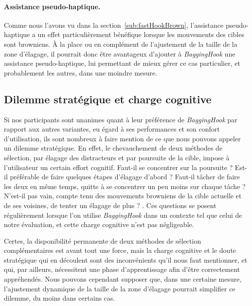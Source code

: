 	\paragraph{Assistance pseudo-haptique.}
	Comme nous l'avons vu dans la section~\ref{sub:fastHookBrown}, l'assistance pseudo-haptique a un effet particulièrement bénéfique lorsque les mouvements des cibles sont browniens. À la place ou en complément de l'ajustement de la taille de la zone d'élagage, il pourrait donc être avantageux d'ajouter à \emph{BaggingHook} une assistance pseudo-haptique, lui permettant de mieux gérer ce cas particulier, et probablement les autres, dans une moindre mesure.
	
	\subsection{Dilemme stratégique et charge cognitive}
	Si nos participants sont unanimes quant à leur préférence de \emph{BaggingHook} par rapport aux autres variantes, eu égard à ses performances et son confort d'utilisation, ils sont nombreux à faire mention de ce que nous pouvons appeler un dilemme stratégique. En effet, le chevauchement de deux méthodes de sélection, par élagage des distracteurs et par poursuite de la cible, impose à l'utilisateur un certain effort cognitif. \og Faut-il se concentrer sur la poursuite ? Est-il préférable de faire quelques étapes d'élagage d'abord ? Faut-il tâcher de faire les deux en même temps, quitte à se concentrer un peu moins sur chaque tâche ? N'est-il pas vain, compte tenu des mouvements browniens de la cible actuelle et de ses voisines, de tenter un élagage de plus ? \fg{}. Ces questions se posent régulièrement lorsque l'on utilise \emph{BaggingHook} dans un contexte tel que celui de notre évaluation, et cette \og charge cognitive \fg{} n'est pas négligeable.
	
	Certes, la disponibilité permanente de deux méthodes de sélection complémentaires est avant tout une force, mais la charge cognitive et le doute stratégique qui en découlent sont des inconvénients qu'il nous faut mentionner, et qui, par ailleurs, nécessitent une phase d'apprentissage afin d'être correctement appréhendés. Nous pouvons cependant supposer que, dans une certaine mesure, l'ajustement dynamique de la taille de la zone d'élagage pourrait simplifier ce dilemme, du moins dans certains cas.
	
